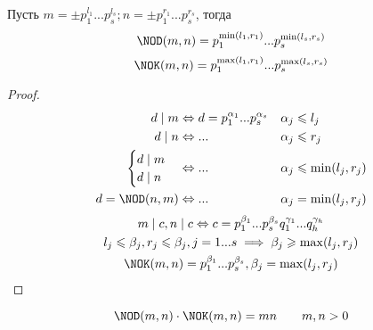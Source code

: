 \documentclass[main]{subfiles}
\begin{document}
\begin{proposition}
    Пусть $m =\pm p_1^{l_1} ... p_s^{l_s}; n = \pm p_1^{r_1} ... p_s^{r_s}$, тогда
    \[\NOD(m,n) = p_1^{\min(l_1, r_1)}... p_s^{\min(l_s, r_s)}\]
    \[\NOK(m,n) = p_1^{\max(l_1, r_1)}... p_s^{\max(l_s, r_s)}\]
\end{proposition}
\begin{proof}
    \begin{align*}
        d \mid m    & \Leftrightarrow d = p_1^{\alpha_1} ... p_s^{\alpha_s} & \alpha_j & \le l_j            \\
        d \mid n    & \Leftrightarrow ...                                   & \alpha_j & \le r_j            \\
        \begin{cases}
            d \mid m \\
            d \mid n
        \end{cases}
                    & \Leftrightarrow ...                                   & \alpha_j & \le \min(l_j, r_j) \\
        d=\NOD(n,m) & \Leftrightarrow ...                                   & \alpha_j & = \min(l_j, r_j)
    \end{align*}
    \begin{gather*}
        m\mid c, n \mid c
        \Leftrightarrow c = p_1^{\beta_1}... p_s^{\beta_s} q_1^{\gamma_1}...q_h^{\gamma_h}\\
        l_j\le \beta_j, r_j \le \beta_j, j=1...s
        \implies \beta_j \ge \max(l_j, r_j)\\
        \NOK(m,n) = p_1^{\beta_1}... p_s^{\beta_s}, \beta_j = \max(l_j, r_j)
    \end{gather*}
\end{proof}

\begin{corollary}
    \[\NOD(m,n) \cdot \NOK(m,n) = mn\qquad m,n >0\]
\end{corollary}
\end{document}
